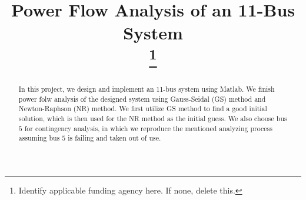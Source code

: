 \documentclass[conference]{IEEEtran}
\begin{document}
\title{Power Flow Analysis of an 11-Bus System\\
\thanks{Identify applicable funding agency here. If none, delete this.}
}

\author{
\and
{}
}

\maketitle

\begin{abstract}
In this project, we design and implement an 11-bus system using Matlab. We finish power folw analysis of the designed system using Gauss-Seidal (GS) method and Newton-Raphson (NR) method. We first utilize GS method to find a good initial solution, which is then used for the NR method as the initial guess. We also choose bus $5$ for contingency analysis, in which we reproduce the mentioned analyzing process assuming bus $5$ is failing and taken out of use.
\end{abstract}
\end{document}
